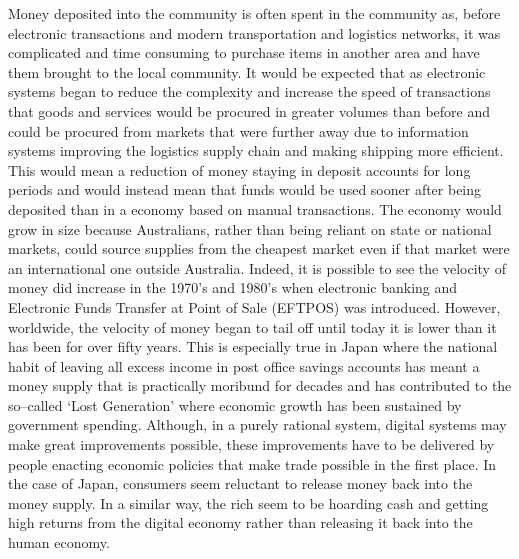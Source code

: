 Money deposited into the community is often spent in the community as, before electronic transactions and modern transportation and logistics networks, it was complicated and time consuming to purchase items in another area and have them brought to the local community. It would be expected that as electronic systems began to reduce the complexity and increase the speed of transactions that  goods and services would be procured in greater volumes than before and could be procured from markets that were further away due to information systems improving the logistics supply chain and making shipping more efficient. This would mean a reduction of money staying in deposit accounts for long periods and would instead mean that funds would be used sooner after being deposited than in a economy based on manual transactions. The economy would grow in size because Australians, rather than being reliant on state or national markets, could source supplies from the cheapest market even if that market were an international one outside Australia. Indeed, it is possible to see the velocity of money did increase in the 1970's and 1980's when electronic banking and Electronic Funds Transfer at Point of Sale (EFTPOS) was introduced. However, worldwide, the velocity of money began to tail off until today it is lower than it has been for over fifty years. This is especially true in Japan where the national habit of leaving all excess income in post office savings accounts has meant a money supply that is practically moribund for decades and has contributed to the so--called `Lost Generation' where economic growth has been sustained by government spending. Although, in a purely rational system, digital systems may make great improvements possible, these improvements have to be delivered by people enacting economic policies that make trade possible in the first place. In the case of Japan, consumers seem reluctant to release money back into the money supply. In a similar way, the rich seem to be hoarding cash and getting high returns from the digital economy rather than releasing it back into the human economy.
 

